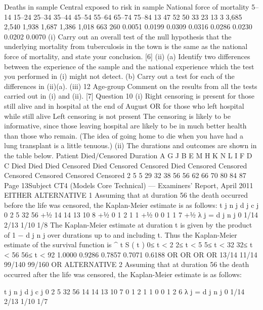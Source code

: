 \documentclass[a4paper,12pt]{article}
\begin{document}
\begin{enumerate}
Deaths in
sample Central exposed to
risk in sample National force
of mortality
5–14
15–24
25–34
35–44
45–54
55–64
65–74
75–84 13
47
52
50
33
23
13
3 3,685
2,540
1,938
1,687
1,386
1,018
663
260 0.0051
0.0199
0.0309
0.0316
0.0286
0.0230
0.0202
0.0070
(i) Carry out an overall test of the null hypothesis that the underlying mortality
from tuberculosis in the town is the same as the national force of mortality,
and state your conclusion.
[6]
(ii) (a)
Identify two differences between the experience of the sample
and the national experience which the test you performed in (i)
might not detect.
(b)
Carry out a test for each of the differences in (ii)(a).
(iii)
12
Age-group
Comment on the results from all the tests carried out in (i) and (ii).
[7]
Question 10
(i)
Right censoring is present
for those still alive and in hospital at the end of August
OR
for those who left hospital while still alive
Left censoring is not present
The censoring is likely to be informative, since those leaving hospital are likely to be in much better health than those who remain. (The idea of going home to die when you have had a lung transplant is a little tenuous.)
(ii)
The durations and outcomes are shown in the table below.
Patient Died/Censored Duration
A
G
J
B
E
M
H
K
N
L
I
F
D
C Died
Died
Died
Censored
Died
Censored
Censored
Died
Censored
Censored
Censored
Censored
Censored
Censored 2
5
5
29
32
38
56
56
62
66
70
80
84
87
Page 13Subject CT4 (Models Core Technical) — Examiners’ Report, April 2011
EITHER ALTERNATIVE 1
Assuming that at duration 56 the death occurred before the life was censored, the
Kaplan-Meier estimate is as follows:
t j n j d j c j
0
2
5
32
56
+1⁄2 14
14
13
10
8
+1⁄2 0
1
2
1
1
+1⁄2 0
0
1
1
7
+1⁄2
λ j =
d j
n j
0
1/14
2/13
1/10
1/8
The Kaplan-Meier estimate at duration t is given by the product of 1 −
d j
n j
over
durations up to and including t. Thus the Kaplan-Meier estimate of the survival
function is
^
t S ( t )
0≤ t < 2
2≤ t < 5
5≤ t < 32
32≤ t < 56
56≤ t < 92 1.0000
0.9286
0.7857
0.7071
0.6188
OR
OR
OR
OR
13/14
11/14
99/140
99/160
OR ALTERNATIVE 2
Assuming that at duration 56 the death occurred after the life was censored, the Kaplan-Meier estimate is as follows:

t j n j d j c j
0
2
5
32
56 14
14
13
10
7 0
1
2
1
1 0
0
1
2
6
λ j =
d j
n j
0
1/14
2/13
1/10
1/7


\end{enumerate}
\end{document}
